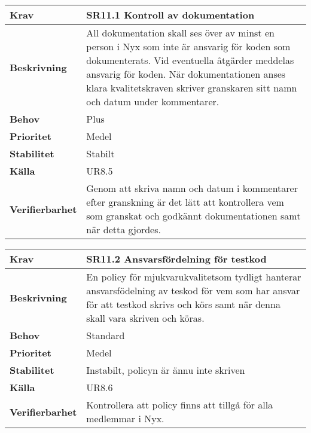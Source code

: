 \documentclass[a4paper, twoside, 11pt, titlepage]{article}
\begin{document}
	\begin {table} [ht] \begin{tabular} { p{2.6cm} p{12.5cm} }
		\hline
		\sffamily\textbf{Krav} & \sffamily\textbf{SR11.1 Kontroll av dokumentation } \\
		\hline
		\sffamily\textbf{Beskrivning} &  All dokumentation skall ses över av minst en person i Nyx som inte är ansvarig för koden som dokumenterats. Vid eventuella åtgärder meddelas ansvarig för koden. När dokumentationen anses klara kvalitetskraven skriver granskaren sitt namn och datum under kommentarer.  \\
		\hline
		\sffamily\textbf{Behov} & Plus  \\
		\hline
		\sffamily\textbf{Prioritet} & Medel  \\
		\hline
		\sffamily\textbf{Stabilitet} & Stabilt  \\
		\hline
		\sffamily\textbf{Källa} &  UR8.5  \\
		\hline
		\sffamily\textbf{Verifierbarhet} &  Genom att skriva namn och datum i kommentarer efter granskning är det lätt att kontrollera vem som granskat och godkännt dokumentationen samt när detta gjordes.  \\
		\hline
	\end{tabular} \end{table} \FloatBarrier
	\vspace{6mm}

	\begin {table} [ht] \begin{tabular} { p{2.6cm} p{12.5cm} }
		\hline
		\sffamily\textbf{Krav} & \sffamily\textbf{SR11.2 Ansvarsfördelning för testkod } \\
		\hline
		\sffamily\textbf{Beskrivning} &  En policy för mjukvarukvalitetsom tydligt hanterar ansvarsfödelning av teskod för vem som har ansvar för att testkod skrivs och körs samt när denna skall vara skriven och köras.  \\
		\hline
		\sffamily\textbf{Behov} & Standard  \\
		\hline
		\sffamily\textbf{Prioritet} & Medel  \\
		\hline
		\sffamily\textbf{Stabilitet} &  Instabilt, policyn är ännu inte skriven  \\
		\hline
		\sffamily\textbf{Källa} &  UR8.6   \\
		\hline
		\sffamily\textbf{Verifierbarhet} &  Kontrollera att policy finns att tillgå för alla medlemmar i Nyx.  \\
		\hline
	\end{tabular} \end{table} \FloatBarrier
	\vspace{6mm}
\end{document}
